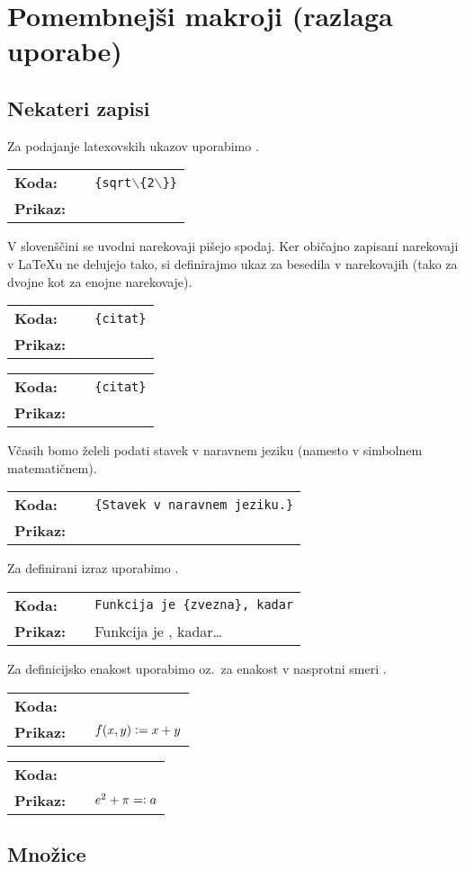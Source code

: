 \chapter*{Pomembnejši makroji (razlaga uporabe)}


\newcommand{\ponazoritev}[2]{

\medskip
\begin{tabular}{lll}
\textbf{Koda:} && \texttt{#1} \\[1ex]
\textbf{Prikaz:} && {#2}
\end{tabular}
\bigskip

}

\section*{Nekateri zapisi}

Za podajanje latexovskih ukazov uporabimo . 
\ponazoritev{\ltc{ltc}\{sqrt$\backslash$\{2$\backslash$\}\}}{\ltc{sqrt\{2\}}}

V slovenščini se uvodni narekovaji pišejo spodaj. Ker običajno zapisani narekovaji v LaTeXu ne delujejo tako, si definirajmo ukaz za besedila v narekovajih (tako za dvojne kot za enojne narekovaje).
\ponazoritev{\ltc{qt}\{citat\}}{\qt{citat}}
\ponazoritev{\ltc{sqt}\{citat\}}{\sqt{citat}}

Včasih bomo želeli podati stavek v naravnem jeziku (namesto v simbolnem matematičnem).
\ponazoritev{\ltc{nls}\{Stavek v naravnem jeziku.\}}{\nls{Stavek v naravnem jeziku.}}

Za definirani izraz uporabimo .
\ponazoritev{Funkcija je \ltc{df}\{zvezna\}, kadar\ltc{ldots}}{Funkcija je \df{zvezna}, kadar\ldots}

Za definicijsko enakost uporabimo  oz.~za enakost v nasprotni smeri .
\ponazoritev{\textdollar{f(x,y) \ltc{dfeq} x + y}\textdollar}{$f(x,y) \mathrel{\mathop:}= x + y$}
\ponazoritev{\textdollar{e\^{}2 + \ltc{pi} \ltc{revdfeq} a}\textdollar}{$e^2 + \pi =\mathrel{\mathop:} a$}

\section*{Množice}

